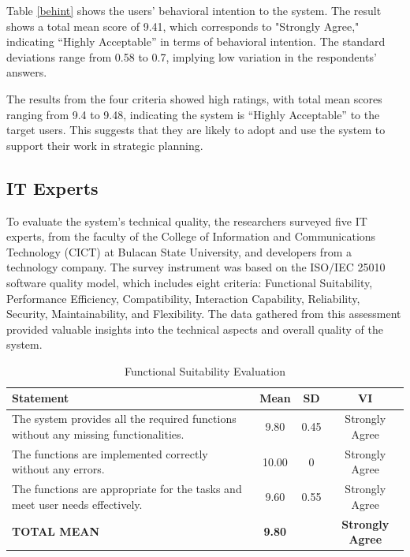 	Table \ref{behint} shows the users’ behavioral intention to the system. The result shows a total mean score of 9.41, which corresponds to "Strongly Agree," indicating “Highly Acceptable” in terms of behavioral intention. The standard deviations range from 0.58 to 0.7, implying low variation in the respondents’ answers.
	
	The results from the four criteria showed high ratings, with total mean scores ranging from 9.4 to 9.48, indicating the system is “Highly Acceptable” to the target users. This suggests that they are likely to adopt and use the system to support their work in strategic planning.
	
\subsection{IT Experts}
	To evaluate the system’s technical quality, the researchers surveyed five IT experts, from the faculty of the College of Information and Communications Technology (CICT) at Bulacan State University, and developers from a technology company. The survey instrument was based on the ISO/IEC 25010 software quality model, which includes eight criteria: Functional Suitability, Performance Efficiency, Compatibility, Interaction Capability, Reliability, Security, Maintainability, and Flexibility. The data gathered from this assessment provided valuable insights into the technical aspects and overall quality of the system.
	
	\begin{table}[h!]
		\centering
		\caption{Functional Suitability Evaluation}
		\label{funcsus}
		\renewcommand{\arraystretch}{1.2}
		\begin{tabularx}{\linewidth}{|X|c|c|c|}
			\hline
			\textbf{Statement} & \textbf{Mean} & \textbf{SD} & \textbf{VI} \\ \hline
			The system provides all the required functions without any missing functionalities.
			& 9.80 & 0.45 & Strongly Agree \\ \hline
			The functions are implemented correctly without any errors.
			& 10.00 & 0 & Strongly Agree \\ \hline
			The functions are appropriate for the tasks and meet user needs effectively.
			& 9.60 & 0.55 & Strongly Agree \\ \hline
			\textbf{TOTAL MEAN} & \textbf{9.80} & & \textbf{Strongly Agree} \\ \hline
		\end{tabularx}
	\end{table}
	
